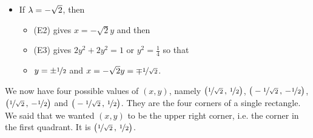 \begin{eg}
\begin{itemize}
\item If $\lambda=-\sqrt{2}$, then 
\begin{itemize}\itemsep1pt \parskip0pt 
\item
(E2) gives $x=-\sqrt{2}y$ and then
\item
(E3) gives $2y^2+2y^2=1$ or $y^2=\frac{1}{4}$ so that
\item
$y=\pm\nicefrac{1}{2}$ and $x=-\sqrt{2}y=\mp\nicefrac{1}{\sqrt{2}}$.
\end{itemize}

\end{itemize}
We now have four possible values of $(x,y)$, namely
$\big(\nicefrac{1}{\sqrt{2}}\,,\,\nicefrac{1}{2}\big)$,
$\big(-\nicefrac{1}{\sqrt{2}}\,,\,-\nicefrac{1}{2}\big)$,
$\big(\nicefrac{1}{\sqrt{2}}\,,\,-\nicefrac{1}{2}\big)$
and
$\big(-\nicefrac{1}{\sqrt{2}}\,,\,\nicefrac{1}{2}\big)$.
They are the four corners of a single rectangle. We said that we wanted
$(x,y)$ to be the upper right corner, i.e. the corner in the first quadrant.
It is $\big(\nicefrac{1}{\sqrt{2}}\,,\,\nicefrac{1}{2}\big)$. 
\end{eg}


